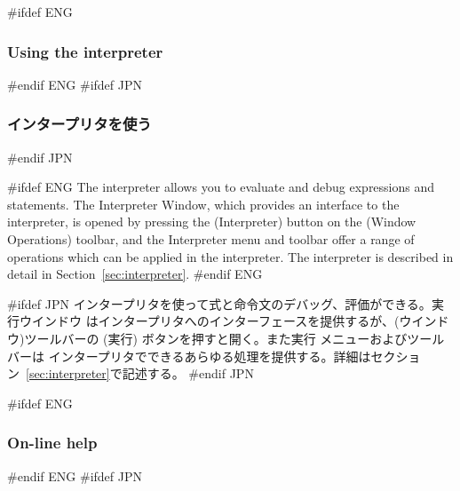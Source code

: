 \documentclass[\pformat,12pt]{article}
\newcommand{\guicmd}[1]{{\sf #1}}
\newcommand{\guicmd}[1]{{\gt #1}}
\begin{document}


#ifdef ENG
\subsubsection{Using the interpreter}
#endif ENG
#ifdef JPN
\subsubsection{インタープリタを使う}
#endif JPN

#ifdef ENG
The interpreter allows you to evaluate and debug expressions and
statements. The \guicmd{Interpreter Window}, which provides an
interface to the interpreter, is opened by pressing the 
(\guicmd{Interpreter}) button on the (\guicmd{Window Operations})
toolbar, and the \guicmd{Interpreter} menu and toolbar offer a range
of operations which can be applied in the interpreter. The interpreter
is described in detail in Section~\ref{sec:interpreter}.
#endif ENG

#ifdef JPN
インタープリタを使って式と命令文のデバッグ、評価ができる。\guicmd{実行ウインドウ}
はインタープリタへのインターフェースを提供するが、(\guicmd{ウインドウ})ツールバーの 
(\guicmd{実行}) ボタンを押すと開く。また\guicmd{実行} メニューおよびツールバーは
インタープリタでできるあらゆる処理を提供する。詳細はセクション~\ref{sec:interpreter}で記述する。
#endif JPN

#ifdef ENG
\subsubsection{On-line help}
#endif ENG
#ifdef JPN
\end{document}
